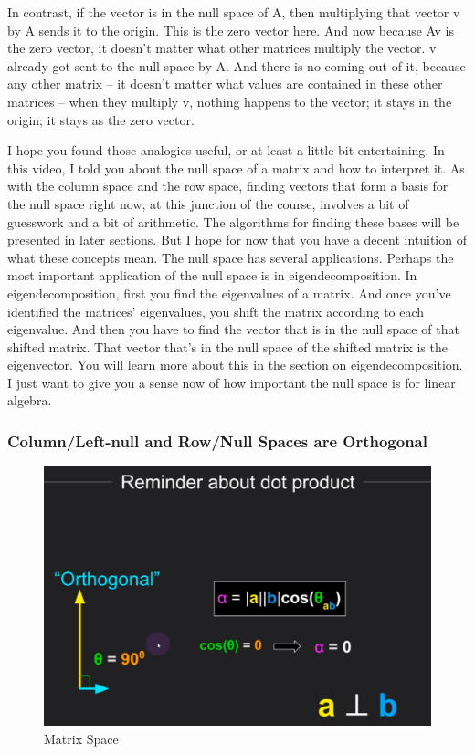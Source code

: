 \documentclass[fleqn,10pt]{olplainarticle}
\theoremstyle{definition}
\theoremstyle{remark}
\begin{document}
In contrast, if the vector is in the null space of A, then multiplying that vector v by A sends it to the origin. This is the zero vector here. And now because Av is the zero vector, it doesn't matter what other matrices multiply the vector. v already got sent to the null space by A. And there is no coming out of it, because any other matrix -- it doesn't matter what values are contained in these other matrices -- when they multiply v, nothing happens to the vector; it stays in the origin; it stays as the zero vector.

I hope you found those analogies useful, or at least a little bit entertaining. In this video, I told you about the null space of a matrix and how to interpret it. As with the column space and the row space, finding vectors that form a basis for the null space right now, at this junction of the course, involves a bit of guesswork and a bit of arithmetic. The algorithms for finding these bases will be presented in later sections. But I hope for now that you have a decent intuition of what these concepts mean. The null space has several applications. Perhaps the most important application of the null space is in eigendecomposition. In eigendecomposition, first you find the eigenvalues of a matrix. And once you've identified the matrices' eigenvalues, you shift the matrix according to each eigenvalue. And then you have to find the vector that is in the null space of that shifted matrix. That vector that's in the null space of the shifted matrix is the eigenvector. You will learn more about this in the section on eigendecomposition. I just want to give you a sense now of how important the null space is for linear algebra.

\pagebreak

\subsubsection*{Column/Left-null and Row/Null Spaces are Orthogonal}

\begin{figure}[ht]
	\centering
	\includegraphics[width=0.6\linewidth]{images/matrix-space-26.png}
	\caption{Matrix Space}
	\label{fig:matrix_space_26}
\end{figure}
\end{document}

